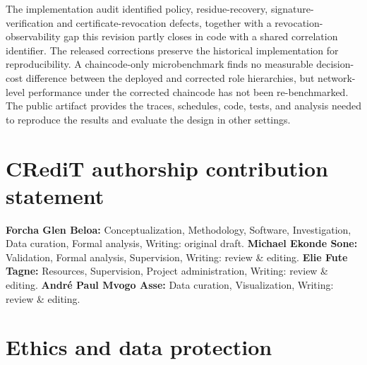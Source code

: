 \documentclass[a4paper,fleqn]{cas-sc}
\begin{document}
The implementation audit identified policy, residue-recovery,
signature-verification and certificate-revocation defects, together with a
revocation-observability gap this revision partly closes in code with a
shared correlation identifier. The released corrections preserve the
historical implementation for reproducibility. A chaincode-only
microbenchmark finds no measurable decision-cost difference between the
deployed and corrected role hierarchies, but network-level performance
under the corrected chaincode has not been re-benchmarked. The public
artifact provides the traces, schedules, code, tests, and analysis needed
to reproduce the results and evaluate the design in other settings.

\section*{CRediT authorship contribution statement}

\textbf{Forcha Glen Beloa:} Conceptualization, Methodology, Software,
Investigation, Data curation, Formal analysis, Writing: original draft.
\textbf{Michael Ekonde Sone:} Validation, Formal analysis, Supervision,
Writing: review \& editing. \textbf{Elie Fute Tagne:} Resources,
Supervision, Project administration, Writing: review \& editing.
\textbf{Andr\'{e} Paul Mvogo Asse:} Data curation, Visualization,
Writing: review \& editing.

\section*{Ethics and data protection}
\end{document}
